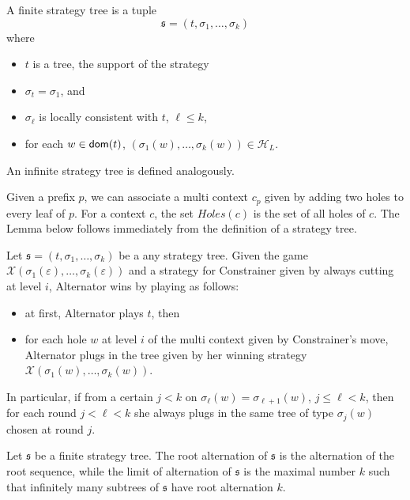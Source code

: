 A finite strategy tree is a tuple
\[ \mathfrak{s}=(t, \sigma_1, \dots, \sigma_k) \] where
\begin{itemize}
\item $t$ is a tree, the support of the strategy
\item $\sigma_t=\sigma_1$, and
\item $\sigma_\ell$ is locally consistent with $t$, $\ell \leq k$,
\item for each $w \in \mathsf{dom}(t)$, $(\sigma_1(w), \dots, \sigma_k(w)) \in \mathcal{H}_L$.
\end{itemize}
An  infinite strategy tree is defined analogously.

Given a prefix $p$, we can associate a multi context $c_p$ given by adding two holes to every leaf of $p$. For a context $c$, the set $Holes(c)$ is the set of all holes of $c$. The Lemma below follows immediately from the definition of a strategy tree.
\begin{lemma}\label{lemma:short_strategy}
Let $\mathfrak{s}=(t, \sigma_1, \dots, \sigma_k)$ be a any strategy tree. Given the  game $\mathcal{X}(\sigma_1(\varepsilon), \dots, \sigma_k(\varepsilon))$ and a strategy for Constrainer given by always cutting at level $i$, Alternator wins  by playing as follows:
\begin{itemize}
\item at first, Alternator plays $t$, then
\item for each hole $w$ at level $i$ of the multi context given by Constrainer's move, Alternator plugs in the tree given by her winning strategy $\mathcal{X}(\sigma_1(w), \dots, \sigma_k(w))$.
\end{itemize}
In particular, if from a certain $j<k$ on $\sigma_\ell(w)=\sigma_{\ell+1}(w)$, $j\leq \ell < k$, then for each round $j< \ell < k$ she always plugs in the same tree of type $\sigma_j(w)$ chosen at round $j$.
\end{lemma}
Let $\mathfrak{s}$ be a finite strategy tree. The root alternation of $\mathfrak{s}$ is the alternation of the root sequence, while the limit of alternation of $\mathfrak{s}$ is the maximal number $k$ such that infinitely many subtrees of $\mathfrak{s}$ have root alternation $k$. 

